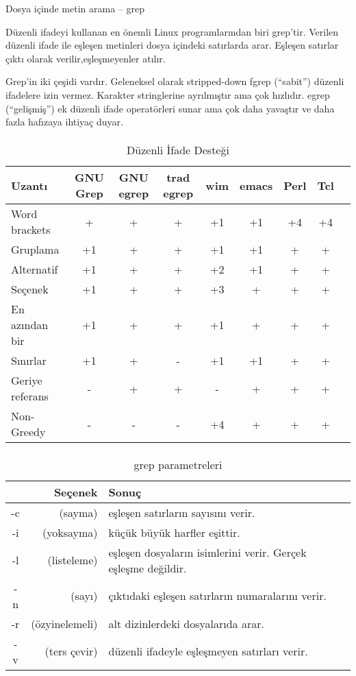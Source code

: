 \begin{section}{Dosya içinde metin arama – grep}

Düzenli ifadeyi kullanan en önemli Linux programlarından biri grep’tir. Verilen düzenli ifade ile eşleşen metinleri dosya içindeki satırlarda arar. Eşleşen satırlar çıktı olarak verilir,eşleşmeyenler atılır.

Grep’in iki çeşidi vardır. Geleneksel olarak stripped-down fgrep (“sabit”) düzenli ifadelere izin vermez. Karakter stringlerine ayrılmıştır ama çok hızlıdır. egrep (“gelişmiş”) ek düzenli ifade operatörleri sunar ama çok daha yavaştır ve daha fazla hafızaya ihtiyaç duyar.

\paragraph{}{
\begin {table}[H]
\caption {Düzenli İfade Desteği} \label{tab:title} 
\begin{tabular}{l c c c c c c c c}
\hline
Uzantı & GNU Grep & GNU egrep & trad egrep & wim & emacs & Perl & Tcl \\
\hline
Word brackets & + & + & + &+1&+1&+4&+4\\
Gruplama & +1 & +&+&+1&+1&+&+\\
Alternatif & +1 & +&+&+2&+1&+&+\\
Seçenek & +1 & +&+&+3&+&+&+\\
En azından bir & +1 & +&+&+1&+&+&+\\
Sınırlar & +1 & +&-&+1&+1&+&+\\
Geriye referans & - & +&+&-&+&+&+\\
Non-Greedy & - & -&-&+4&+&+&+\\
\hline
\end{tabular}
\end {table}
}

\paragraph{}{
\begin {table}[H]
\caption {grep parametreleri} \label{tab:title} 
\begin{tabular}{c r l}
\hline
{} & Seçenek & Sonuç\\
\hline
-c &	(sayma)	&	eşleşen satırların sayısını verir.\\
-i	&(yoksayma)	&küçük büyük harfler eşittir.\\
-l	&(listeleme)&	eşleşen dosyaların isimlerini verir. Gerçek eşleşme değildir.\\
-n	&(sayı)&		çıktıdaki eşleşen satırların numaralarını verir.\\
-r	&(özyinelemeli)&	alt dizinlerdeki dosyalarıda arar.\\
-v&	(ters çevir)&	düzenli ifadeyle eşleşmeyen satırları verir.\\
\hline
\end{tabular}
\end {table}
}


\end{section}
